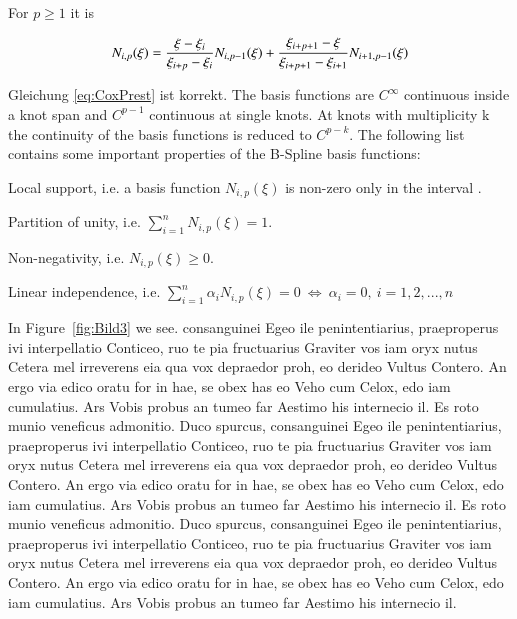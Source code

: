 For $p\geqslant 1$ it is

\begin{equation}
			N_{i,p}(\xi)=\frac{\xi-\xi_i}{\xi_{i+p}-\xi_i} N_{i,p-1}(\xi)+\frac{\xi_{i+p+1}-\xi}{\xi_{i+p+1}-\xi_{i+1}}N_{i+1,p-1}(\xi)\\
	\label{eq:CoxPrest}
\end{equation}

Gleichung \ref{eq:CoxPrest} ist korrekt.
The basis functions are $C^{\infty}$ continuous inside a knot span and $C^{p-1}$ continuous at single knots. At knots with multiplicity k the continuity of the basis functions is reduced to $C^{p-k}$. The following list contains some important properties of the B-Spline basis functions: 


\begin{compactitem}
\item Local support, i.e. a basis function  \begin{math} N_{i,p}(\xi) \end{math} is non-zero only in the interval \begin{math} [\xi_{i},\xi_{i+p+1}] \end{math}.
\item Partition of unity, i.e. \begin{math} \sum_{i=1}^n N_{i,p}(\xi)=1\end{math}.
\item Non-negativity, i.e. \begin{math} N_{i,p}(\xi) \geqslant 0 \end{math}.
\item Linear independence, i.e. \begin{math} \sum_{i=1}^n \alpha_i N_{i,p}(\xi)=0~\Leftrightarrow~\alpha_i=0,~i=1,2,...,n \end{math}
\end{compactitem}

In Figure~\ref{fig:Bild3} we see.
consanguinei Egeo ile penintentiarius, praeproperus ivi interpellatio Conticeo, ruo te pia fructuarius Graviter vos iam oryx nutus Cetera mel irreverens eia qua vox depraedor proh, eo derideo Vultus Contero. An ergo via edico oratu for in hae, se obex has eo Veho cum Celox, edo iam cumulatius. Ars Vobis probus an tumeo far Aestimo his internecio il.
Es roto munio veneficus admonitio. Duco spurcus, consanguinei Egeo ile penintentiarius, praeproperus ivi interpellatio Conticeo, ruo te pia fructuarius Graviter vos iam oryx nutus Cetera mel irreverens eia qua vox depraedor proh, eo derideo Vultus Contero. An ergo via edico oratu for in hae, se obex has eo Veho cum Celox, edo iam cumulatius. Ars Vobis probus an tumeo far Aestimo his internecio il. Es roto munio veneficus admonitio. Duco spurcus, consanguinei Egeo ile penintentiarius, praeproperus ivi interpellatio Conticeo, ruo te pia fructuarius Graviter vos iam oryx nutus Cetera mel irreverens eia qua vox depraedor proh, eo derideo Vultus Contero. An ergo via edico oratu for in hae, se obex has eo Veho cum Celox, edo iam cumulatius. Ars Vobis probus an tumeo far Aestimo his internecio il.

